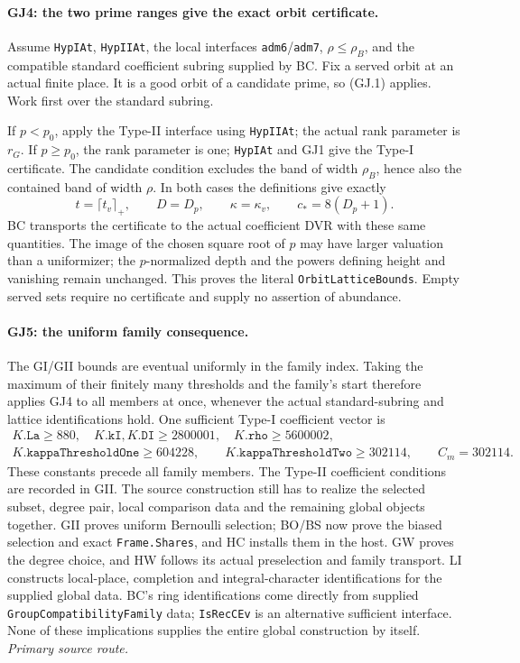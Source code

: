 \documentclass[11pt,a4paper]{article}
\numberwithin{equation}{section}
\theoremstyle{remark}\newtheorem{remark}[theorem]{Remark}
\begin{document}
\paragraph{GJ4: the two prime ranges give the exact orbit certificate.}
Assume \texttt{HypIAt}, \texttt{HypIIAt}, the local interfaces
\texttt{adm6}/\texttt{adm7}, $\rho\le\rho_B$, and the compatible
standard coefficient subring supplied by BC. Fix a served orbit at an
actual finite place. It is a good orbit of a candidate prime, so (GJ.1)
applies. Work first over the standard subring.

If $p<p_0$, apply the Type-II interface using \texttt{HypIIAt}; the
actual rank parameter is $r_G$. If $p\ge p_0$, the rank parameter is
one; \texttt{HypIAt} and GJ1 give the Type-I certificate. The candidate
condition excludes the band of width $\rho_B$, hence also the contained
band of width $\rho$. In both cases the definitions give exactly
\[
 t=\lceil t_v\rceil_+,\qquad D=D_p,\qquad
 \kappa=\kappa_v,\qquad c_*=8(D_p+1).                 \tag{GJ.2}
\]
BC transports the certificate to the actual coefficient DVR with
these same quantities. The image of the chosen square root of $p$
may have larger valuation than a uniformizer; the $p$-normalized
depth and the powers defining height and vanishing remain unchanged.
This proves the literal \texttt{OrbitLatticeBounds}. Empty served sets
require no certificate and supply no assertion of abundance.

\paragraph{GJ5: the uniform family consequence.}
The GI/GII bounds are eventual uniformly in the family index. Taking
the maximum of their finitely many thresholds and the family's start
therefore applies GJ4 to all members at once, whenever the actual
standard-subring and lattice identifications hold. One sufficient
Type-I coefficient vector is
\[
\begin{gathered}
 K.\texttt{La}\ge880,\quad K.\texttt{kI},K.\texttt{DI}\ge2800001,
 \quad K.\texttt{rho}\ge5600002,\\
 K.\texttt{kappaThresholdOne}\ge604228,\qquad
 K.\texttt{kappaThresholdTwo}\ge302114,\qquad C_m=302114.
\end{gathered}                                                   \tag{GJ.3}
\]
These constants precede all family members. The Type-II coefficient
conditions are recorded in GII. The source construction still has to
realize the selected subset, degree pair, local comparison data and the
remaining global objects together. GII proves uniform Bernoulli
selection; BO/BS now prove the biased selection and exact
\texttt{Frame.Shares}, and HC installs them in the host.
GW proves the degree choice, and HW follows its actual preselection
and family transport. LI constructs local-place, completion and
integral-character identifications for the supplied global data.
BC's ring identifications
come directly from supplied \texttt{GroupCompatibilityFamily} data;
\texttt{IsRecCEv} is an alternative sufficient interface. None of these
implications supplies the entire global construction by itself.
\noindent\textit{Primary source route.}\cite{family-orbit-join}
\end{document}
